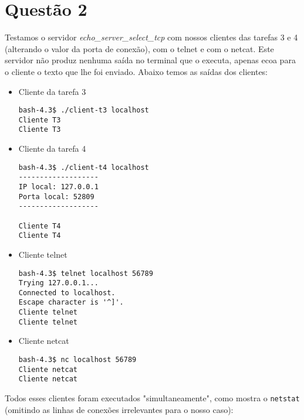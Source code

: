 \documentclass[a4paper,10pt]{article}
\begin{document}
\section{Questão 2}
Testamos o servidor \textit{echo\_server\_select\_tcp} com nossos clientes das tarefas 3 e 4 (alterando o valor da porta de conexão), com o telnet e com o netcat.
Este servidor não produz nenhuma saída no terminal que o executa, apenas ecoa para o cliente o texto que lhe foi enviado.
Abaixo temos as saídas dos clientes:

\begin{itemize}
\item Cliente da tarefa 3

\begin{lstlisting}
bash-4.3$ ./client-t3 localhost
Cliente T3
Cliente T3

\end{lstlisting}

\item Cliente da tarefa 4

\begin{lstlisting}
bash-4.3$ ./client-t4 localhost
-------------------
IP local: 127.0.0.1
Porta local: 52809
-------------------

Cliente T4
Cliente T4
\end{lstlisting}

\item Cliente telnet

\begin{lstlisting}
bash-4.3$ telnet localhost 56789
Trying 127.0.0.1...
Connected to localhost.
Escape character is '^]'.
Cliente telnet
Cliente telnet

\end{lstlisting}

\item Cliente netcat

\begin{lstlisting}
bash-4.3$ nc localhost 56789
Cliente netcat
Cliente netcat

\end{lstlisting}

\end{itemize}

Todos esses clientes foram executados "simultaneamente", como mostra o {\tt netstat} (omitindo as linhas de conexões irrelevantes para o nosso caso):
\end{document}
